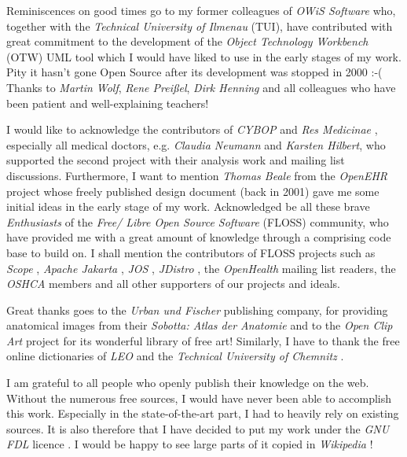 Reminiscences on good times go to my former colleagues of \emph{OWiS Software}
who, together with the \emph{Technical University of Ilmenau} (TUI), have
contributed with great commitment to the development of the
\emph{Object Technology Workbench} (OTW) UML tool which I would have liked to
use in the early stages of my work. Pity it hasn't gone Open Source after its
development was stopped in 2000 :-( Thanks to \emph{Martin Wolf},
\emph{Rene Prei\ss{}el}, \emph{Dirk Henning} and all colleagues who have been
patient and well-explaining teachers!

I would like to acknowledge the contributors of \emph{CYBOP} \cite{cybop} and
\emph{Res Medicinae} \cite{resmedicinae}, especially all medical doctors, e.g.
\emph{Claudia Neumann} and \emph{Karsten Hilbert}, who supported the second
project with their analysis work \cite{resmedicinae2001} and mailing list
discussions. Furthermore, I want to mention \emph{Thomas Beale} from the
\emph{OpenEHR} project \cite{openehr} whose freely published design document
(back in 2001) gave me some initial ideas in the early stage of my work.
Acknowledged be all these brave \emph{Enthusiasts} of the
\emph{Free/ Libre Open Source Software} (FLOSS) community, who have provided me
with a great amount of knowledge through a comprising code base to build on.
I shall mention the contributors of FLOSS projects such as \emph{Scope}
\cite{scope}, \emph{Apache Jakarta} \cite{jakarta}, \emph{JOS} \cite{jos},
\emph{JDistro} \cite{jdistro}, the \emph{OpenHealth} \cite{openhealth} mailing
list readers, the \emph{OSHCA} \cite{oshca} members and all other supporters of
our projects and ideals.

Great thanks goes to the \emph{Urban und Fischer} publishing company, for
providing anatomical images from their \emph{Sobotta: Atlas der Anatomie}
\cite{urban} and to the \emph{Open Clip Art} project \cite{openclipart} for its
wonderful library of free art! Similarly, I have to thank the free online
dictionaries of \emph{LEO} \cite{leo} and the
\emph{Technical University of Chemnitz} \cite{tuchemnitz}.

I am grateful to all people who openly publish their knowledge on the web.
Without the numerous free sources, I would have never been able to accomplish
this work. Especially in the state-of-the-art part, I had to heavily rely on
existing sources. It is also therefore that I have decided to put my work under
the \emph{GNU FDL} licence \cite{gnulicences}. I would be happy to see large
parts of it copied in \emph{Wikipedia} \cite{wikipedia}!
